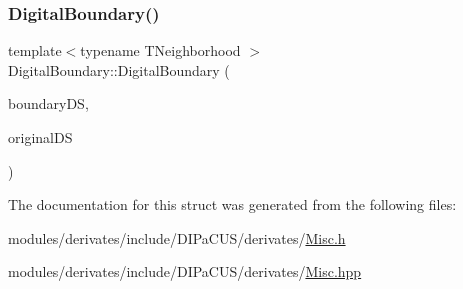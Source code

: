\subsubsection{\texorpdfstring{Digital\+Boundary()}{DigitalBoundary()}}
{\footnotesize\ttfamily template$<$typename T\+Neighborhood $>$ \\
Digital\+Boundary\+::\+Digital\+Boundary (\begin{DoxyParamCaption}\item[{\mbox{\hyperlink{structDIPaCUS_1_1Misc_1_1DigitalBoundary_aedd7527b8021fdf88fcb01474bd77027}{Digital\+Set}} \&}]{boundary\+DS,  }\item[{const \mbox{\hyperlink{structDIPaCUS_1_1Misc_1_1DigitalBoundary_aedd7527b8021fdf88fcb01474bd77027}{Digital\+Set}} \&}]{original\+DS }\end{DoxyParamCaption})}



The documentation for this struct was generated from the following files\+:\begin{DoxyCompactItemize}
\item 
modules/derivates/include/\+D\+I\+Pa\+C\+U\+S/derivates/\mbox{\hyperlink{Misc_8h}{Misc.\+h}}\item 
modules/derivates/include/\+D\+I\+Pa\+C\+U\+S/derivates/\mbox{\hyperlink{Misc_8hpp}{Misc.\+hpp}}\end{DoxyCompactItemize}

